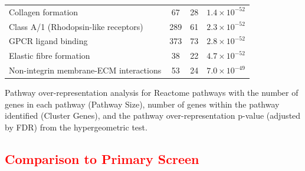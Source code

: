 \begin{table}[!htb]
{\begin{threeparttable}
\begin{tabular}{lccc}
  \rowcolor{Cluster_Red!15}
  Collagen formation &  67 &  28 & $1.4 \times 10^{-52}$ \\ 
  \rowcolor{Cluster_Red!20}
  Class A/1 (Rhodopsin-like receptors) & 289 &  61 & $2.3 \times 10^{-52}$ \\ 
  \rowcolor{Cluster_Red!15}
  GPCR ligand binding & 373 &  73 & $2.8 \times 10^{-52}$ \\ 
  \rowcolor{Cluster_Red!20}
  Elastic fibre formation &  38 &  22 & $4.7 \times 10^{-52}$ \\ 
  \rowcolor{Cluster_Red!15}
  Non-integrin membrane-ECM interactions &  53 &  24 & $7.0 \times 10^{-49}$ \\ 
 \hline
\end{tabular}
\begin{tablenotes}
\raggedright %
Pathway over-representation analysis for Reactome pathways with the number of genes in each pathway (Pathway Size), number of genes within the pathway identified (Cluster Genes), and the pathway over-representation p-value (adjusted by \gls{FDR}) from the hypergeometric test.  
\end{tablenotes}
\end{threeparttable}
}
\end{table}


\FloatBarrier

\subsection{\textcolor{red}{Comparison to Primary Screen}} \label{chapt3:compare_SL_genes_stad}

